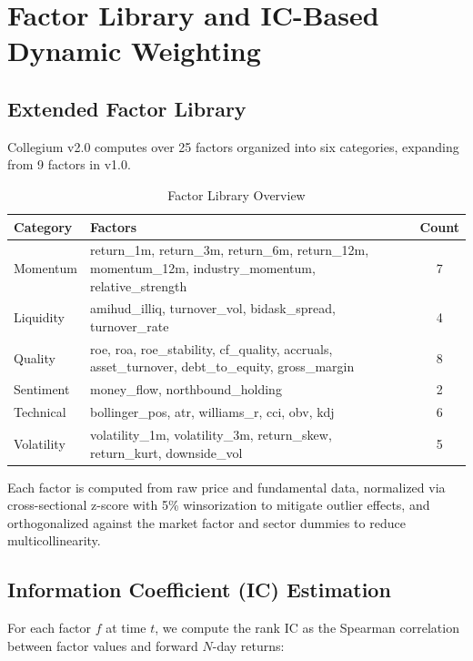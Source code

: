 \documentclass[12pt]{article}
\begin{document}
\section{Factor Library and IC-Based Dynamic Weighting}

\subsection{Extended Factor Library}

Collegium v2.0 computes over 25 factors organized into six categories, expanding from 9 factors in v1.0.

\begin{table}[h]
\centering
\caption{Factor Library Overview}
\begin{tabular}{llc}
\toprule
\textbf{Category} & \textbf{Factors} & \textbf{Count} \\
\midrule
Momentum & return\_1m, return\_3m, return\_6m, return\_12m, momentum\_12m, industry\_momentum, relative\_strength & 7 \\
Liquidity & amihud\_illiq, turnover\_vol, bidask\_spread, turnover\_rate & 4 \\
Quality & roe, roa, roe\_stability, cf\_quality, accruals, asset\_turnover, debt\_to\_equity, gross\_margin & 8 \\
Sentiment & money\_flow, northbound\_holding & 2 \\
Technical & bollinger\_pos, atr, williams\_r, cci, obv, kdj & 6 \\
Volatility & volatility\_1m, volatility\_3m, return\_skew, return\_kurt, downside\_vol & 5 \\
\bottomrule
\end{tabular}
\end{table}

Each factor is computed from raw price and fundamental data, normalized via cross-sectional z-score with 5\% winsorization to mitigate outlier effects, and orthogonalized against the market factor and sector dummies to reduce multicollinearity.

\subsection{Information Coefficient (IC) Estimation}

For each factor $f$ at time $t$, we compute the rank IC as the Spearman correlation between factor values and forward $N$-day returns:
\end{document}
